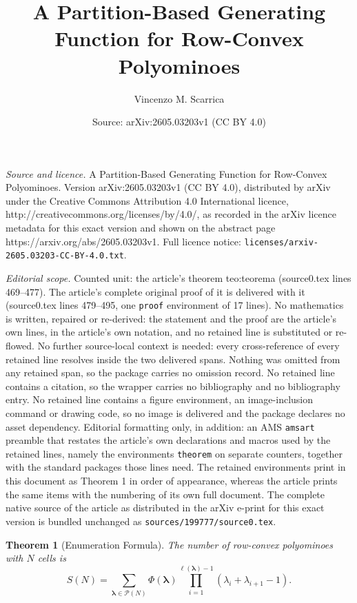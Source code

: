 \documentclass[10pt,a4paper]{amsart}
\title{A Partition-Based Generating Function for Row-Convex Polyominoes}
\author{Vincenzo M. Scarrica}
\date{Source: arXiv:2605.03203v1 (CC BY 4.0)}
\newtheorem{theorem}{Theorem}
\begin{document}
\maketitle

\noindent\emph{Source and licence.} A Partition-Based Generating Function for Row-Convex Polyominoes. Version arXiv:2605.03203v1 (CC BY 4.0), distributed by arXiv under the Creative Commons Attribution 4.0 International licence, http://creativecommons.org/licenses/by/4.0/, as recorded in the arXiv licence metadata for this exact version and shown on the abstract page https://arxiv.org/abs/2605.03203v1. Full licence notice: \texttt{licenses/arxiv-2605.03203-CC-BY-4.0.txt}.\par\smallskip

\noindent\textit{Editorial scope.} Counted unit: the article's theorem teo:teorema (source0.tex lines 469--477). The article's complete original proof of it is delivered with it (source0.tex lines 479--495, one \texttt{proof} environment of 17 lines). No mathematics is written, repaired or re-derived: the statement and the proof are the article's own lines, in the article's own notation, and no retained line is substituted or re-flowed.  No further source-local context is needed: every cross-reference of every retained line resolves inside the two delivered spans.  Nothing was omitted from any retained span, so the package carries no omission record.  No retained line contains a citation, so the wrapper carries no bibliography and no bibliography entry.  No retained line contains a figure environment, an image-inclusion command or drawing code, so no image is delivered and the package declares no asset dependency.  Editorial formatting only, in addition: an AMS \texttt{amsart} preamble that restates the article's own declarations and macros used by the retained lines, namely the environments \texttt{theorem} on separate counters, together with the standard packages those lines need.  The retained environments print in this document as Theorem 1 in order of appearance, whereas the article prints the same items with the numbering of its own full document.  The complete native source of the article as distributed in the arXiv e-print for this exact version is bundled unchanged as \texttt{sources/199777/source0.tex}.
\begin{theorem}[Enumeration Formula]
\label{teo:teorema}
The number of row-convex polyominoes with $N$ cells is
\[
S(N) = \sum_{\boldsymbol{\lambda} \in \mathcal{P}(N)} 
\Phi(\boldsymbol{\lambda}) \prod_{i=1}^{\ell(\boldsymbol{\lambda})-1} 
(\lambda_i + \lambda_{i+1} - 1).
\]
\end{theorem}
\end{document}

